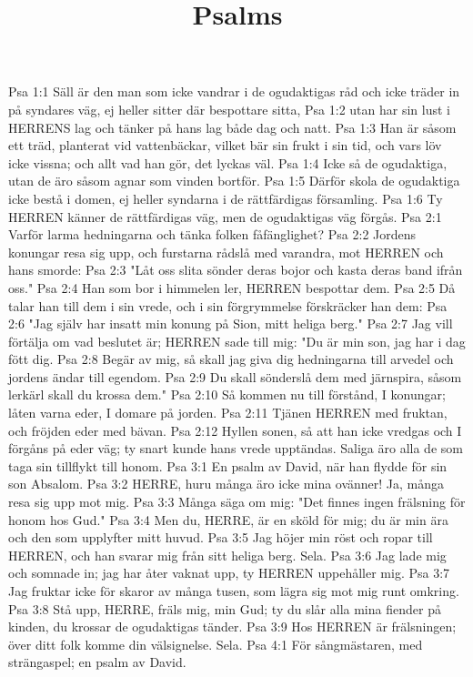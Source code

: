 

\title{Psalms}

Psa 1:1  Säll är den man som icke vandrar i de ogudaktigas råd och icke träder in på syndares väg, ej heller sitter där bespottare sitta,
Psa 1:2  utan har sin lust i HERRENS lag och tänker på hans lag både dag och natt.
Psa 1:3  Han är såsom ett träd, planterat vid vattenbäckar, vilket bär sin frukt i sin tid, och vars löv icke vissna; och allt vad han gör, det lyckas väl.
Psa 1:4  Icke så de ogudaktiga, utan de äro såsom agnar som vinden bortför.
Psa 1:5  Därför skola de ogudaktiga icke bestå i domen, ej heller syndarna i de rättfärdigas församling.
Psa 1:6  Ty HERREN känner de rättfärdigas väg, men de ogudaktigas väg förgås.
Psa 2:1  Varför larma hedningarna och tänka folken fåfänglighet?
Psa 2:2  Jordens konungar resa sig upp, och furstarna rådslå med varandra, mot HERREN och hans smorde:
Psa 2:3  "Låt oss slita sönder deras bojor och kasta deras band ifrån oss."
Psa 2:4  Han som bor i himmelen ler, HERREN bespottar dem.
Psa 2:5  Då talar han till dem i sin vrede, och i sin förgrymmelse förskräcker han dem:
Psa 2:6  "Jag själv har insatt min konung på Sion, mitt heliga berg."
Psa 2:7  Jag vill förtälja om vad beslutet är; HERREN sade till mig: "Du är min son, jag har i dag fött dig.
Psa 2:8  Begär av mig, så skall jag giva dig hedningarna till arvedel och jordens ändar till egendom.
Psa 2:9  Du skall sönderslå dem med järnspira, såsom lerkärl skall du krossa dem."
Psa 2:10  Så kommen nu till förstånd, I konungar; låten varna eder, I domare på jorden.
Psa 2:11  Tjänen HERREN med fruktan, och fröjden eder med bävan.
Psa 2:12  Hyllen sonen, så att han icke vredgas och I förgåns på eder väg; ty snart kunde hans vrede upptändas. Saliga äro alla de som taga sin tillflykt till honom.
Psa 3:1  En psalm av David, när han flydde för sin son Absalom.
Psa 3:2  HERRE, huru många äro icke mina ovänner! Ja, många resa sig upp mot mig.
Psa 3:3  Många säga om mig: "Det finnes ingen frälsning för honom hos Gud."
Psa 3:4  Men du, HERRE, är en sköld för mig; du är min ära och den som upplyfter mitt huvud.
Psa 3:5  Jag höjer min röst och ropar till HERREN, och han svarar mig från sitt heliga berg. Sela.
Psa 3:6  Jag lade mig och somnade in; jag har åter vaknat upp, ty HERREN uppehåller mig.
Psa 3:7  Jag fruktar icke för skaror av många tusen, som lägra sig mot mig runt omkring.
Psa 3:8  Stå upp, HERRE, fräls mig, min Gud; ty du slår alla mina fiender på kinden, du krossar de ogudaktigas tänder.
Psa 3:9  Hos HERREN är frälsningen; över ditt folk komme din välsignelse. Sela.
Psa 4:1  För sångmästaren, med strängaspel; en psalm av David.
